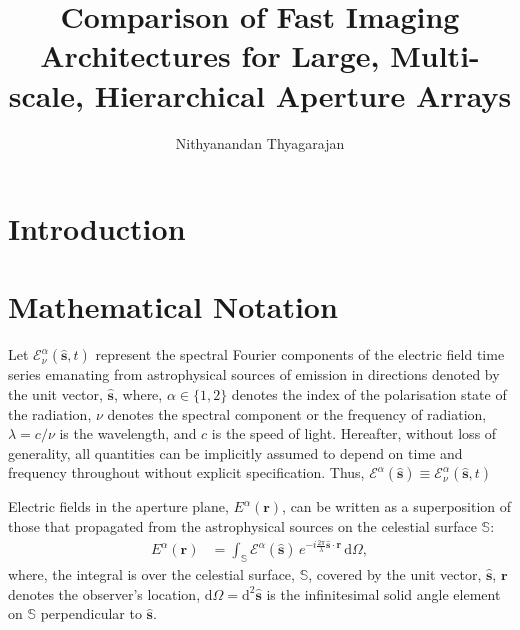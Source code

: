 \documentclass[
  journal=pasa,
  manuscript=article-type,
  year=2020,
  volume=37,
]{cup-journal}
\title{Comparison of Fast Imaging Architectures for Large, Multi-scale, Hierarchical Aperture Arrays}
\author{Nithyanandan Thyagarajan}
\affiliation{CSIRO, Space \& Astronomy, P. O. Box 1130, Bentley, WA 6102, Australia}
\begin{document}
\begin{abstract}

\end{abstract}

\section{Introduction}

\cite{TMS2017}
\cite{Otobe+1994,Tegmark+2009,Tegmark+2010,Zheng+2014}
\cite{Morales2011,Thyagarajan+2017}
\cite{Cornwell+2008}
\cite{Beardsley+2017}

\section{Mathematical Notation}

Let $\mathcal{E}^\alpha_\nu(\hat{\boldsymbol{s}},t)$ represent the spectral Fourier components of the electric field time series emanating from astrophysical sources of emission in directions denoted by the unit vector, $\hat{\boldsymbol{s}}$, where, $\alpha\in\{1,2\}$ denotes the index of the polarisation state of the radiation, $\nu$ denotes the spectral component or the frequency of radiation, $\lambda=c/\nu$ is the wavelength, and $c$ is the speed of light. Hereafter, without loss of generality, all quantities can be implicitly assumed to depend on time and frequency throughout without explicit specification. Thus, $\mathcal{E}^\alpha(\hat{\boldsymbol{s}})\equiv \mathcal{E}^\alpha_\nu(\hat{\boldsymbol{s}},t)$

Electric fields in the aperture plane, $E^\alpha(\boldsymbol{r})$, can be written as a superposition of those that propagated from the astrophysical sources on the celestial surface $\mathbb{S}$:
\begin{align}
    E^\alpha(\boldsymbol{r}) &= \int_\mathbb{S} \mathcal{E}^\alpha(\hat{\boldsymbol{s}})\, e^{-i \frac{2\pi}{\lambda}\hat{\boldsymbol{s}}\cdot\boldsymbol{r}} \,\mathrm{d}\Omega,
\end{align}
where, the integral is over the celestial surface, $\mathbb{S}$, covered by the unit vector, $\hat{\boldsymbol{s}}$, $\boldsymbol{r}$ denotes the observer's location, $\mathrm{d}\Omega=\mathrm{d}^2\hat{\boldsymbol{s}}$ is the infinitesimal solid angle element on $\mathbb{S}$ perpendicular to $\hat{\boldsymbol{s}}$. 
\end{document}

